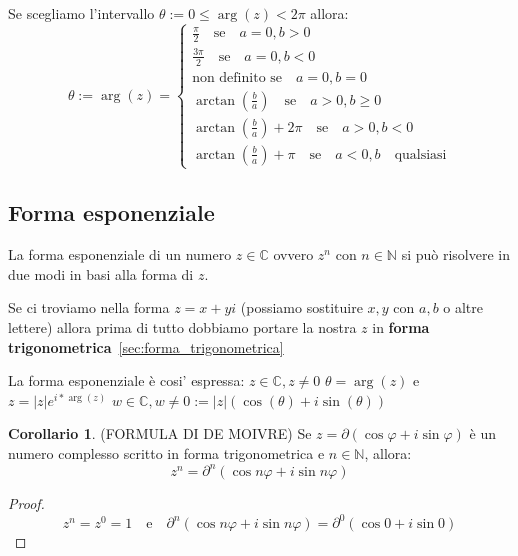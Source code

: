\documentclass{article}
\theoremstyle{definition}
\newtheorem{corollario}{Corollario}[section]
\begin{document}
\begin{tcolorbox}
Se scegliamo l'intervallo $ \theta := 0 \le \arg(z) < 2\pi $ allora:
\[ \theta := \arg(z) =
\begin{cases}
        \frac{\pi}{2} \quad \mbox{se} \quad a=0, b>0 \\ 
        \frac{3\pi}{2} \quad \mbox{se} \quad a=0, b<0 \\ 
        \mbox{non definito se} \quad a=0, b=0 \\ 
        \arctan(\frac{b}{a}) \quad \mbox{se} \quad a>0, b \ge 0 \\ 
        \arctan(\frac{b}{a}) + 2\pi \quad \mbox{se} \quad a>0, b<0 \\ 
        \arctan(\frac{b}{a}) + \pi \quad \mbox{se} \quad a<0, b \quad \mbox{qualsiasi}  
\end{cases}
\]
\end{tcolorbox}



\subsection{Forma esponenziale}\label{sec:forma_esponenziale}
La forma esponenziale di un numero $ z \in \mathbb{C} $ ovvero $ z^n $ con $ n \in \mathbb{N} $ si può risolvere in due modi in basi alla forma di $ z  $.

Se ci troviamo nella forma $ z = x + yi $ (possiamo sostituire $ x,y $ con $ a,b  $ o altre lettere) allora prima di tutto dobbiamo portare la nostra $ z $ in \textbf{forma trigonometrica}~\ref{sec:forma_trigonometrica}

\begin{tcolorbox}
La forma esponenziale è cosi' espressa: \newline
$z \in \mathbb{C}, z \not = 0$ \newline
$\theta = \arg(z)$ e  $z = | z | e^{i*\arg(z)}$ \newline
$w \in \mathbb{C}, w \not = 0 := |z| (\cos(\theta) + i\sin(\theta))$ \newline
\end{tcolorbox}

\begin{tcolorbox}
\begin{corollario}
        (FORMULA DI DE MOIVRE) Se $z = \partial(\cos \varphi + i\sin\varphi)$ è un numero complesso scritto in forma trigonometrica e $ n \in \mathbb{N}$, allora:
        \begin{equation*}
                z^n = \partial^n(\cos n\varphi + i\sin n \varphi)
        \end{equation*}

        \begin{proof}
                \begin{equation*}
                        z^n = z^0 = 1 \quad \mbox{e} \quad \partial^n(\cos n\varphi + i\sin n\varphi) = \partial^0(\cos 0 + i\sin 0) 
                \end{equation*}        
        \end{proof}
\end{corollario}
\end{tcolorbox}
\end{document}
